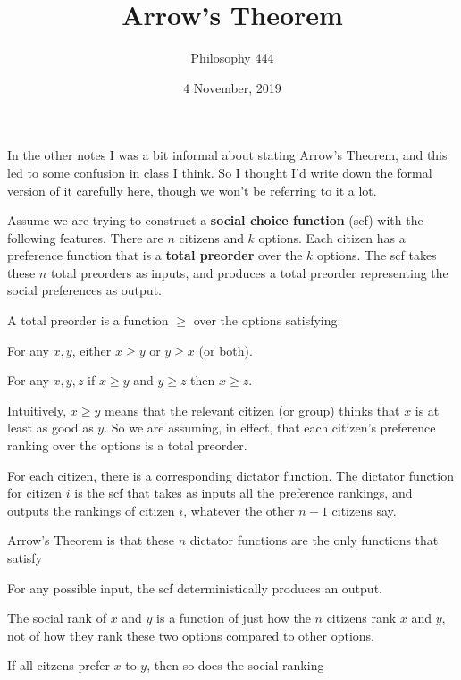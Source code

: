 \documentclass[11pt,]{article}
\title{Arrow's Theorem}
\author{Philosophy 444}
\date{4 November, 2019}
\providecommand{\tightlist}{%
  \setlength{\itemsep}{0pt}\setlength{\parskip}{0pt}}
\begin{document}
\maketitle

In the other notes I was a bit informal about stating Arrow's Theorem,
and this led to some confusion in class I think. So I thought I'd write
down the formal version of it carefully here, though we won't be
referring to it a lot.

Assume we are trying to construct a \textbf{social choice function}
(scf) with the following features. There are \(n\) citizens and \(k\)
options. Each citizen has a preference function that is a \textbf{total
preorder} over the \(k\) options. The scf takes these \(n\) total
preorders as inputs, and produces a total preorder representing the
social preferences as output.

A total preorder is a function \(\geq\) over the options satisfying:

\begin{description}
\tightlist
\item[Completeness]
For any \(x, y\), either \(x \geq y\) or \(y \geq x\) (or both).
\item[Transitivity]
For any \(x, y, z\) if \(x \geq y\) and \(y \geq z\) then \(x \geq z\).
\end{description}

Intuitively, \(x \geq y\) means that the relevant citizen (or group)
thinks that \(x\) is at least as good as \(y\). So we are assuming, in
effect, that each citizen's preference ranking over the options is a
total preorder.

For each citizen, there is a corresponding dictator function. The
dictator function for citizen \(i\) is the scf that takes as inputs all
the preference rankings, and outputs the rankings of citizen \(i\),
whatever the other \(n-1\) citizens say.

Arrow's Theorem is that these \(n\) dictator functions are the only
functions that satisfy

\begin{description}
\tightlist
\item[Universal Domain]
For any possible input, the scf deterministically produces an output.
\item[Independence of Irrelevant Alternatives (IIA)]
The social rank of \(x\) and \(y\) is a function of just how the \(n\)
citizens rank \(x\) and \(y\), not of how they rank these two options
compared to other options.
\item[Pareto]
If all citzens prefer \(x\) to \(y\), then so does the social ranking
\end{description}
\end{document}
